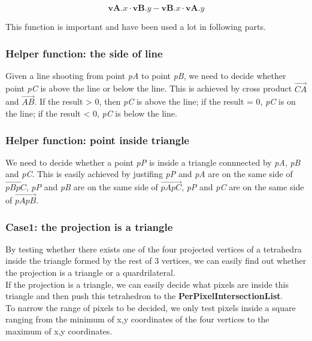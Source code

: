 \documentclass[acmtog]{acmart}
\begin{document}
\begin{equation} 
\boldsymbol {vA}.x \cdot 
\boldsymbol {vB}.y - 
\boldsymbol {vB}.x \cdot 
\boldsymbol {vA}.y
\end{equation} 

This function is important and have been used a lot in following parts. 
\\
\subsubsection{Helper function: the side of line}
Given a line shooting from point \emph{pA} to point \emph{pB}, we need to decide whether point \emph{pC} is above the line or below the line. This is achieved by cross product $\overrightarrow{CA}$ and $\overrightarrow{AB}$. If the result > 0, then \emph{pC} is above the line; if the result = 0, \emph{pC} is on the line; if the result < 0, \emph{pC} is below the line.
\\
\subsubsection{Helper function: point inside triangle}
We need to decide whether a point \emph{pP} is inside a triangle connnected by \emph{pA}, \emph{pB} and \emph{pC}. This is easily achieved by justifing \emph{pP} and \emph{pA} are on the same side of $\overrightarrow{pBpC}$, \emph{pP} and \emph{pB} are on the same side of $\overrightarrow{pApC}$, \emph{pP} and \emph{pC} are on the same side of $\overrightarrow{pApB}$.
\\
\subsubsection{Case1: the projection is a triangle}
By testing whether there exists one of the four projected vertices of a tetrahedra inside the triangle formed by the rest of 3 vertices, we can easily find out whether the projection is a triangle or a quardrilateral.
\\If the projection is a triangle, we can easily decide what pixels are inside this triangle and then push this tetrahedron to the \textbf{PerPixelIntersectionList}.
\\To narrow the range of pixels to be decided, we only test pixels inside a square ranging from the minimum of x,y coordinates of the four vertices to the maximum of x,y coordinates.
\\
\end{document}

